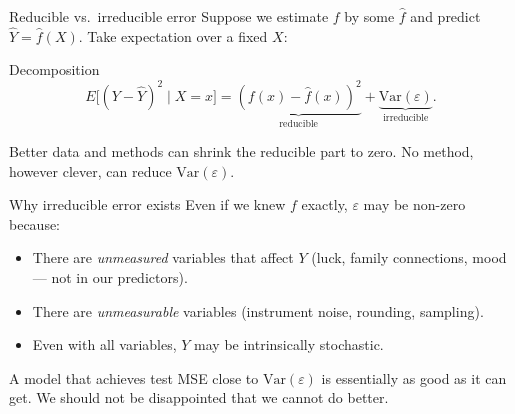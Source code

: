 \documentclass[aspectratio=169,11pt]{beamer}
\begin{document}
\begin{frame}{Reducible vs.\ irreducible error}
  Suppose we estimate $f$ by some $\hat{f}$ and predict
  $\hat{Y} = \hat{f}(X)$. Take expectation over a fixed $X$:
  \begin{block}{Decomposition}
    \[
      \boxed{\;
        E\bigl[(Y - \hat Y)^2 \mid X = x\bigr]
          = \underbrace{(f(x) - \hat f(x))^2}_{\text{reducible}}
           + \underbrace{\mathrm{Var}(\varepsilon)}_{\text{irreducible}}.
      \;}
    \]
  \end{block}
  \begin{takeaway}
    Better data and methods can shrink the reducible part to zero.
    No method, however clever, can reduce
    $\mathrm{Var}(\varepsilon)$.
  \end{takeaway}
\end{frame}

\begin{frame}{Why irreducible error exists}\label{frm:irred}
  Even if we knew $f$ exactly, $\varepsilon$ may be non-zero because:
  \begin{readme}
    \begin{itemize}
      \item There are \emph{unmeasured} variables that affect $Y$
            (luck, family connections, mood --- not in our predictors).
      \item There are \emph{unmeasurable} variables (instrument
            noise, rounding, sampling).
      \item Even with all variables, $Y$ may be intrinsically
            stochastic.
    \end{itemize}
  \end{readme}
  \begin{takeaway}
    A model that achieves test MSE close to
    $\mathrm{Var}(\varepsilon)$ is essentially as good as it can get.
    We should not be disappointed that we cannot do better.
  \end{takeaway}
\end{frame}
\end{document}
